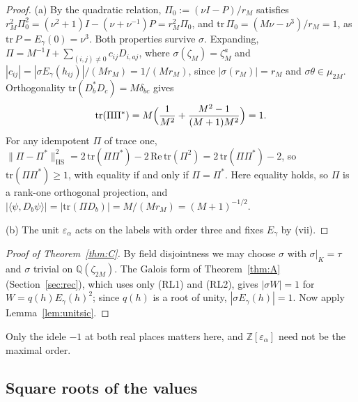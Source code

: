 \documentclass[11pt]{amsart}
\numberwithin{equation}{section}
\theoremstyle{plain}
\theoremstyle{definition}
\theoremstyle{remark}
\begin{document}
\begin{proof}
(a) By the quadratic relation, \(\Pi_0:=(\nu I-P)/r_M\) satisfies \(r_M^2\Pi_0^2=(\nu^2+1)I-(\nu+\nu^{-1})P=r_M^2\Pi_0\), and \(\mathrm{tr}\,\Pi_0=(M\nu-\nu^3)/r_M=1\), as \(\mathrm{tr}\,P=E_\gamma(0)=\nu^3\). Both properties survive \(\sigma\). Expanding, \(\Pi=M^{-1}I+\sum_{(i,j)\ne0}c_{ij}D_{i,aj}\), where \(\sigma(\zeta_M)=\zeta_M^a\) and \(|c_{ij}|=|\sigma E_\gamma(h_{ij})|/(Mr_M)=1/(Mr_M)\), since \(|\sigma(r_M)|=r_M\) and \(\sigma\theta\in\mu_{2M}\). Orthogonality \(\mathrm{tr}(D_b^*D_c)=M\delta_{bc}\) gives
\[\mathrm{tr}(\Pi\Pi^*)=M\Bigl(\frac1{M^2}+\frac{M^2-1}{(M+1)M^2}\Bigr)=1 .\]
For any idempotent \(\Pi\) of trace one, \(\|\Pi-\Pi^*\|_{\mathrm{HS}}^2=2\,\mathrm{tr}(\Pi\Pi^*)-2\,\mathrm{Re}\,\mathrm{tr}(\Pi^2)=2\,\mathrm{tr}(\Pi\Pi^*)-2\), so \(\mathrm{tr}(\Pi\Pi^*)\ge1\), with equality if and only if \(\Pi=\Pi^*\). Here equality holds, so \(\Pi\) is a rank-one orthogonal projection, and \(|\langle\psi,D_b\psi\rangle|=|\mathrm{tr}(\Pi D_b)|=M/(Mr_M)=(M+1)^{-1/2}\).

(b) The unit \(\varepsilon_\alpha\) acts on the labels with order three and fixes \(E_\gamma\) by (vii).
\end{proof}

\begin{proof}[Proof of Theorem~\ref{thm:C}]
By field disjointness we may choose \(\sigma\) with \(\sigma|_K=\tau\) and \(\sigma\) trivial on \(\mathbb Q(\zeta_{2M})\). The Galois form of Theorem~\ref{thm:A} (Section~\ref{sec:rec}), which uses only (RL1) and (RL2), gives \(|\sigma W|=1\) for \(W=q(h)E_\gamma(h)^2\); since \(q(h)\) is a root of unity, \(|\sigma E_\gamma(h)|=1\). Now apply Lemma~\ref{lem:unitsic}.
\end{proof}

Only the idele \(-1\) at both real places matters here, and \(\mathbb Z[\varepsilon_\alpha]\) need not be the maximal order.

\subsection{Square roots of the values}\label{sec:sqrt}
\end{document}

